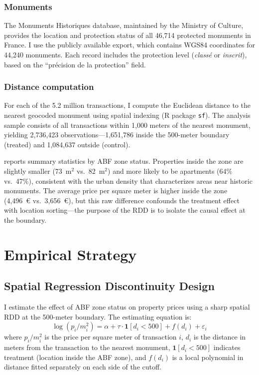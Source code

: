 \documentclass[12pt]{article}
\begin{document}
\subsubsection*{Monuments} The Monuments Historiques database, maintained by the Ministry of Culture, provides the location and protection status of all 46,714 protected monuments in France. I use the publicly available export, which contains WGS84 coordinates for 44,240 monuments. Each record includes the protection level (\textit{class\'{e}} or \textit{inscrit}), based on the ``pr\'{e}cision de la protection'' field.

\subsubsection*{Distance computation} For each of the 5.2 million transactions, I compute the Euclidean distance to the nearest geocoded monument using spatial indexing (R package \texttt{sf}). The analysis sample consists of all transactions within 1,000 meters of the nearest monument, yielding 2,736,423 observations---1,651,786 inside the 500-meter boundary (treated) and 1,084,637 outside (control).

 reports summary statistics by ABF zone status. Properties inside the zone are slightly smaller (73~m$^2$ vs.~82~m$^2$) and more likely to be apartments (64\% vs.~47\%), consistent with the urban density that characterizes areas near historic monuments. The average price per square meter is higher inside the zone (4,496~\euro{} vs.~3,656~\euro), but this raw difference confounds the treatment effect with location sorting---the purpose of the RDD is to isolate the causal effect at the boundary.



\section{Empirical Strategy}

\subsection{Spatial Regression Discontinuity Design}

I estimate the effect of ABF zone status on property prices using a sharp spatial RDD at the 500-meter boundary. The estimating equation is:
\begin{equation}
\log(p_i / m_i^2) = \alpha + \tau \cdot \mathbf{1}[d_i < 500] + f(d_i) + \varepsilon_i
\label{eq:rdd}
\end{equation}
where $p_i / m_i^2$ is the price per square meter of transaction $i$, $d_i$ is the distance in meters from the transaction to the nearest monument, $\mathbf{1}[d_i < 500]$ indicates treatment (location inside the ABF zone), and $f(d_i)$ is a local polynomial in distance fitted separately on each side of the cutoff.
\end{document}
